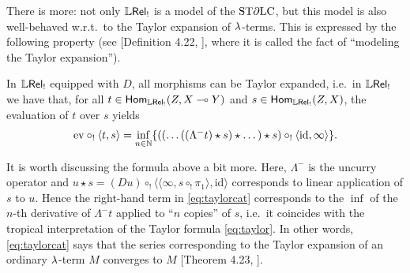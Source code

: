 There is more: not only $\mathbb{L} \mathsf{Rel}_!$ is a model of the $\mathrm{ST}\partial\mathrm{LC}$, but this model is also well-behaved w.r.t.\ to the Taylor expansion of $\lambda$-terms.
This is expressed by the following property (see [Definition 4.22, \cite{Manzo2012}], where it is called the fact of ``modeling the Taylor expansion'').

\begin{theorem}\label{thm:modelsTaylor}
 In $\mathbb{L} \mathsf{Rel}_!$ equipped with $D$, all morphisms can be Taylor expanded, i.e.\ in $\mathbb{L} \mathsf{Rel}_!$ we have that, for all
$t\in\mathsf{Hom}_{\mathbb{L} \mathsf{Rel}_!}(Z,X\multimap Y)$ and $s\in\mathsf{Hom}_{\mathbb{L} \mathsf{Rel}_!}(Z,X)$, the evaluation of $t$ over $s$ yields 
 \begin{align}\label{eq:taylorcat}
  \RM{ev}\circ_!\langle t,s\rangle =
  \inf\limits_{n\in\N}
  \set{((\dots((\Lambda^- t)\star s)\star \dots)\star s)\circ_! \langle \RM{id},\infty \rangle}.
 \end{align}
 \end{theorem}
It is worth discussing the formula above a bit more. 
Here, $\Lambda^-$
 is the uncurry operator and 
$u\star s= (Du)\circ_{!} \langle \langle  \infty, s\circ_{!} \pi_{1}\rangle,\mathrm{id}\rangle$ corresponds to linear application of $s$ to $u$. Hence the right-hand term in \eqref{eq:taylorcat} corresponds to the $\inf$ of the $n$-th derivative of $\Lambda^{-}t$ applied to ``$n$ copies'' of $s$,  i.e.~it coincides with the tropical interpretation of the Taylor formula \eqref{eq:taylor}.
In other words, \eqref{eq:taylorcat} says that the series corresponding to the Taylor expansion of an ordinary $\lambda$-term $M$ converges to $M$ [Theorem 4.23, \cite{Manzo2012}].

%


